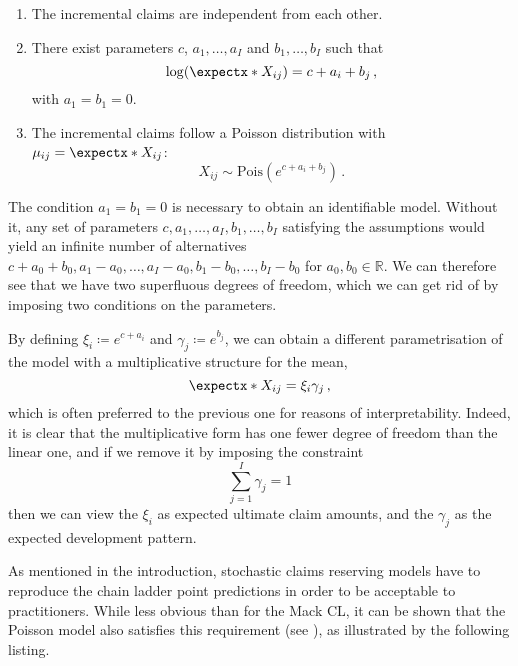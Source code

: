 \documentclass[a4paper]{book}
\begin{document}
\begin{model} \leavevmode \label{model:poisson}
  \begin{enumerate}
      \item \label{assump:poisson1}
      The incremental claims are independent from each other.
      \item \label{assump:poisson2}
      There exist parameters $c$, $a_1, \dots, a_I$ and $b_1, \dots, b_I$ such that
      \begin{equation} \label{eq:linear-predictor-poisson}
          \log(\expect{X_{ij}}) = c + a_i + b_j \,,
      \end{equation}
      with $a_1 = b_1 = 0$.
      \item \label{assump:poisson3}
      The incremental claims follow a Poisson distribution with $\mu_{ij} = \expect{X_{ij}}$:
      \begin{equation}
          X_{ij} \sim \mathrm{Pois}(e^{c + a_i + b_j}) \,.
      \end{equation}
  \end{enumerate}
\end{model}

The condition $a_1 = b_1 = 0$ is necessary to obtain an identifiable model. Without it, any set of parameters $c, a_1, \dots, a_I, b_1, \dots, b_I$ satisfying the assumptions would yield an infinite number of alternatives $c + a_0 + b_0, a_1 - a_0, \dots, a_I - a_0, b_1 - b_0, \dots, b_I - b_0$ for $a_0, b_0 \in \mathbb{R}$. We can therefore see that we have two superfluous degrees of freedom, which we can get rid of by imposing two conditions on the parameters. 

By defining $\xi_i \coloneqq e^{c + a_i}$ and $\gamma_j \coloneqq e^{b_j}$, we can obtain a different parametrisation of the model with a multiplicative structure for the mean,
\begin{equation}
  \expect{X_{ij}} = \xi_i \gamma_j \,,
\end{equation}
which is often preferred to the previous one for reasons of interpretability. Indeed, it is clear that the multiplicative form has one fewer degree of freedom than the linear one, and if we remove it by imposing the constraint
\begin{equation}
  \sum_{j = 1}^I \gamma_j = 1
\end{equation}
then we can view the $\xi_i$ as expected ultimate claim amounts, and the $\gamma_j$ as the expected development pattern.

As mentioned in the introduction, stochastic claims reserving models have to reproduce the chain ladder point predictions in order to be acceptable to practitioners. While less obvious than for the Mack CL, it can be shown that the Poisson model also satisfies this requirement (see \cite[Lemma 2.16]{wuthrich:stochastic-reserving}), as illustrated by the following listing.
\end{document}
